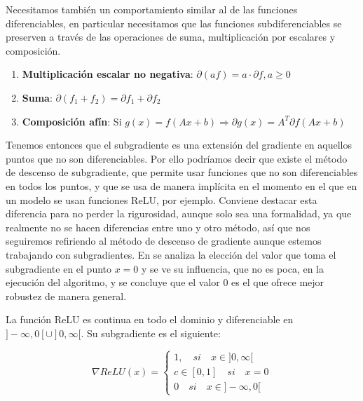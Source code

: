 Necesitamos también un comportamiento similar al de las funciones diferenciables, en particular necesitamos que las funciones subdiferenciables se preserven a través de las operaciones de suma, multiplicación por escalares y composición.

\begin{enumerate}

	\item \textbf{Multiplicación escalar no negativa}: $\partial (af) = a \cdot \partial f , a\geq0$
	
	\item \textbf{Suma}: $\partial (f_1+f_2) = \partial f_1 + \partial f_2$
	
	\item \textbf{Composición afín}: Si $g(x)=f(Ax + b) \Rightarrow \partial g(x)= A^T \partial f(Ax+b)$
	
	

\end{enumerate}

Tenemos entonces que el subgradiente es una extensión del gradiente en aquellos puntos que no son diferenciables. Por ello podríamos decir que existe el método de descenso de subgradiente, que permite usar funciones que no son diferenciables en todos los puntos, y que se usa de manera implícita en el momento en el que en un modelo se usan funciones ReLU, por ejemplo. Conviene destacar esta diferencia para no perder la rigurosidad, aunque solo sea una formalidad, ya que realmente no se hacen diferencias entre uno y otro método, así que nos seguiremos refiriendo al método de descenso de gradiente aunque estemos trabajando con subgradientes. En \cite{ReLuat0} se analiza la elección del valor que toma el subgradiente en el punto $x=0$ y se ve su influencia, que no es poca, en la ejecución del algoritmo, y se concluye que el valor 0 es el que ofrece mejor robustez de manera general.

\begin{ejemplo}\label{ej:RELUsub}
     La función ReLU es continua en todo el dominio y diferenciable en $]-\infty,0[ \cup ]0,\infty[$. Su subgradiente es el siguiente:

    $$ \nabla ReLU(x)=\left\{\begin{matrix}
1, \quad si \quad x \in ]0,\infty[ \\
c \in [0,1] \quad si \quad x=0\\
0 \quad si \quad x \in ]-\infty,0[
\end{matrix}\right.$$
\end{ejemplo}




